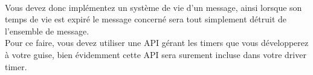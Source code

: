\documentclass[10pt,a4wide]{article}
\begin{document}
\paragraph{}

Vous devez donc impl\'ementez un syst\`eme de vie d'un message, ainsi lorsque son temps de vie est expir\'e le message concern\'e sera tout simplement
d\'etruit de l'ensemble de message.\\
Pour ce faire, vous devez utiliser une API g\'erant les timers que vous d\'evelopperez \`a votre guise, bien \'evidemment cette API sera surement
incluse dans votre driver timer.
\end{document}
